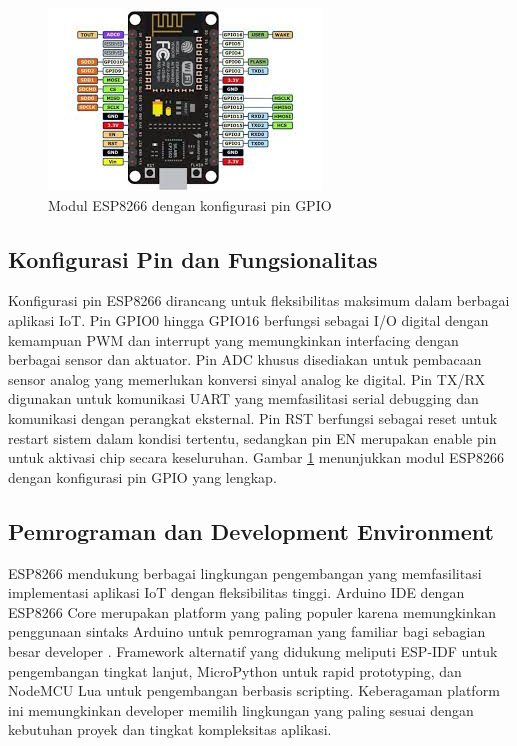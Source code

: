 \begin{figure}
    \centering
    \includegraphics[width=0.5\linewidth]{images/esp 8266.jpg}
    \caption{Modul ESP8266 dengan konfigurasi pin GPIO}
    \label{fig:teori-figure-3}
\end{figure}

\subsection{Konfigurasi Pin dan Fungsionalitas}
Konfigurasi pin ESP8266 dirancang untuk fleksibilitas maksimum dalam berbagai aplikasi IoT. Pin GPIO0 hingga GPIO16 berfungsi sebagai I/O digital dengan kemampuan PWM dan interrupt yang memungkinkan interfacing dengan berbagai sensor dan aktuator. Pin ADC khusus disediakan untuk pembacaan sensor analog yang memerlukan konversi sinyal analog ke digital. Pin TX/RX digunakan untuk komunikasi UART yang memfasilitasi serial debugging dan komunikasi dengan perangkat eksternal. Pin RST berfungsi sebagai reset untuk restart sistem dalam kondisi tertentu, sedangkan pin EN merupakan enable pin untuk aktivasi chip secara keseluruhan. Gambar \ref{fig:teori-figure-3} menunjukkan modul ESP8266 dengan konfigurasi pin GPIO yang lengkap.

\subsection{Pemrograman dan Development Environment}
ESP8266 mendukung berbagai lingkungan pengembangan yang memfasilitasi implementasi aplikasi IoT dengan fleksibilitas tinggi. Arduino IDE dengan ESP8266 Core merupakan platform yang paling populer karena memungkinkan penggunaan sintaks Arduino untuk pemrograman yang familiar bagi sebagian besar developer \citep{monk2016programming}. Framework alternatif yang didukung meliputi ESP-IDF untuk pengembangan tingkat lanjut, MicroPython untuk rapid prototyping, dan NodeMCU Lua untuk pengembangan berbasis scripting. Keberagaman platform ini memungkinkan developer memilih lingkungan yang paling sesuai dengan kebutuhan proyek dan tingkat kompleksitas aplikasi.

